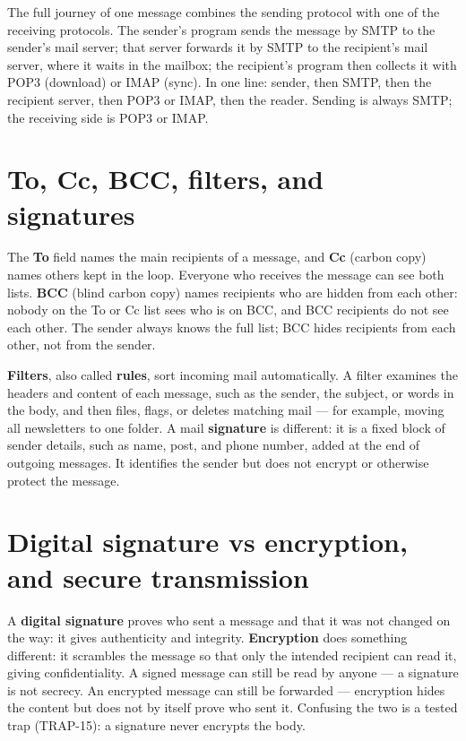 \documentclass[11pt]{article}
\begin{document}
The full journey of one message combines the sending protocol with one of
the receiving protocols. The sender's program sends the message by SMTP to
the sender's mail server; that server forwards it by SMTP to the
recipient's mail server, where it waits in the mailbox; the recipient's
program then collects it with POP3 (download) or IMAP (sync). In one line:
sender, then SMTP, then the recipient server, then POP3 or IMAP, then the
reader. Sending is always SMTP; the receiving side is POP3 or IMAP.

\section{To, Cc, BCC, filters, and signatures}
The \textbf{To} field names the main recipients of a message, and
\textbf{Cc} (carbon copy) names others kept in the loop. Everyone who
receives the message can see both lists. \textbf{BCC} (blind carbon copy)
names recipients who are hidden from each other: nobody on the To or Cc
list sees who is on BCC, and BCC recipients do not see each other. The
sender always knows the full list; BCC hides recipients from each other,
not from the sender.

\textbf{Filters}, also called \textbf{rules}, sort incoming mail
automatically. A filter examines the headers and content of each message,
such as the sender, the subject, or words in the body, and then files,
flags, or deletes matching mail --- for example, moving all newsletters to
one folder. A mail \textbf{signature} is different: it is a fixed block of
sender details, such as name, post, and phone number, added at the end of
outgoing messages. It identifies the sender but does not encrypt or
otherwise protect the message.

\section{Digital signature vs encryption, and secure transmission}
A \textbf{digital signature} proves who sent a message and that it was not
changed on the way: it gives authenticity and integrity. \textbf{Encryption}
does something different: it scrambles the message so that only the
intended recipient can read it, giving confidentiality. A signed message
can still be read by anyone --- a signature is not secrecy. An encrypted
message can still be forwarded --- encryption hides the content but does
not by itself prove who sent it. Confusing the two is a tested trap
(TRAP-15): a signature never encrypts the body.
\end{document}
